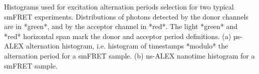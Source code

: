 \label{fig:altern_hist_double}
Histograms used for excitation alternation periods selection for two typical smFRET experiments. 
Distributions of photons detected by the donor channels are in *green*, and by the acceptor channel in *red*.
The light *green* and *red* horizontal span mark the donor and acceptor period definitions.
(a) µs-ALEX alternation histogram, i.e. histogram of timestamps *modulo* the alternation period for a smFRET sample. 
(b) ns-ALEX nanotime histogram for a smFRET sample.